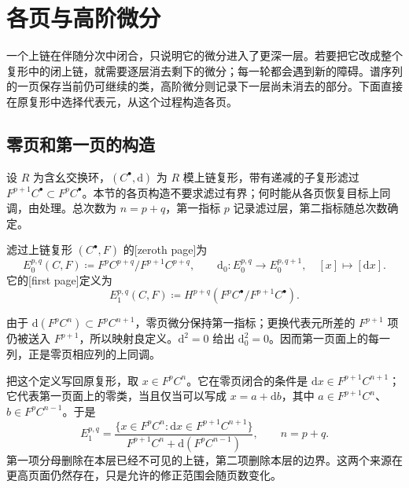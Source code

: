 
% 
% 

\section{各页与高阶微分}
\label{g2:sec:1002}

一个上链在伴随分次中闭合，只说明它的微分进入了更深一层。若要把它改成整个复形中的闭上链，就需要逐层消去剩下的微分；每一轮都会遇到新的障碍。谱序列的一页保存当前仍可继续的类，高阶微分则记录下一层尚未消去的部分。下面直接在原复形中选择代表元，从这个过程构造各页。

\subsection{零页和第一页的构造}
\label{g2:subsec:1002:01}

设 \(R\) 为含幺交换环，\((C^\bullet,\mathrm d)\) 为 \(R\) 模上链复形，带有递减的子复形滤过 \(F^{p+1}C^\bullet\subset F^pC^\bullet\)。本节的各页构造不要求滤过有界；何时能从各页恢复目标上同调，由处理。总次数为 \(n=p+q\)，第一指标 \(p\) 记录滤过层，第二指标随总次数确定。

\begin{definition}\label{g2:def:spectral-sequence-initial-pages}
	滤过上链复形 \((C^\bullet,F)\) 的[zeroth page]为
	\[
		E_0^{p,q}(C,F)\coloneqq F^pC^{p+q}/F^{p+1}C^{p+q},\qquad
		\mathrm d_0:E_0^{p,q}\longrightarrow E_0^{p,q+1},\quad [x]\longmapsto[\mathrm dx].
	\]
	它的[first page]定义为
	\[
		E_1^{p,q}(C,F)\coloneqq H^{p+q}(F^pC^\bullet/F^{p+1}C^\bullet).
	\]
\end{definition}

由于 \(\mathrm d(F^pC^n)\subset F^pC^{n+1}\)，零页微分保持第一指标；更换代表元所差的 \(F^{p+1}\) 项仍被送入 \(F^{p+1}\)，所以映射良定义。\(\mathrm d^2=0\) 给出 \(\mathrm d_0^2=0\)。因而第一页面上的每一列，正是零页相应列的上同调。

\ProseParagraphBreak

把这个定义写回原复形，取 \(x\in F^pC^n\)。它在零页闭合的条件是 \(\mathrm dx\in F^{p+1}C^{n+1}\)；它代表第一页面上的零类，当且仅当可以写成 \(x=a+\mathrm db\)，其中 \(a\in F^{p+1}C^n\)、\(b\in F^pC^{n-1}\)。于是
\begin{equation}\label{g2:eq:first-page-representatives}
	E_1^{p,q}=
	\frac{\{x\in F^pC^n:\mathrm dx\in F^{p+1}C^{n+1}\}}
	{F^{p+1}C^n+\mathrm d(F^pC^{n-1})},\qquad n=p+q.
\end{equation}
第一项分母删除在本层已经不可见的上链，第二项删除本层的边界。这两个来源在更高页面仍然存在，只是允许的修正范围会随页数变化。

